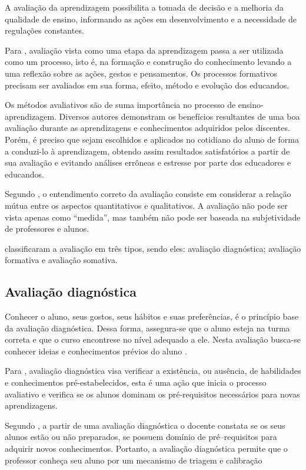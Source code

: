 \documentclass[
	12pt,				%
	openright,			%
	oneside,
	a4paper,			%
	english,			%
	french,				%
	spanish,			%
	brazil,				%
	]{abntex2}
\begin{document}
A avaliação da aprendizagem possibilita a tomada de decisão e a melhoria da qualidade de ensino, informando as ações em desenvolvimento e a necessidade de regulações constantes. \cite{kraemer2005avaliaccao}

Para , avaliação vista como uma etapa da aprendizagem passa a ser utilizada como um processo, isto é, na formação e construção do conhecimento levando a uma reflexão sobre as ações, gestos e pensamentos. Os processos formativos precisam ser avaliados em sua forma, efeito, método e evolução dos educandos.

Os métodos avaliativos são de suma importância no processo de ensino-aprendizagem. Diversos autores demonstram os benefícios resultantes de uma boa avaliação durante as aprendizagens e conhecimentos adquiridos pelos discentes. Porém, é preciso que sejam escolhidos e aplicados no cotidiano do aluno de forma a conduzi-lo à aprendizagem, obtendo assim resultados satisfatórios a partir de sua avaliação e evitando análises errôneas e estresse por parte dos educadores e educandos. \cite{da2014alunos}

Segundo , o entendimento correto da avaliação consiste em considerar a relação mútua entre os aspectos quantitativos e qualitativos. A avaliação não pode ser vista apenas como ``medida'', mas também não pode ser baseada na subjetividade de professores e alunos.

 classificaram a avaliação em três tipos, sendo eles:
avaliação diagnóstica; avaliação formativa e avaliação somativa.

\subsection{Avaliação diagnóstica}
\label{sec:AvaDiag}
Conhecer o aluno, seus gostos, seus hábitos e suas preferências, é o princípio base da avaliação diagnóstica. Dessa forma, assegura-se que o aluno esteja na turma correta e que o curso encontrese no nível adequado a ele. Nesta avaliação busca-se conhecer ideias e conhecimentos prévios do aluno \cite{masetto1994didatica}.

Para , avaliação diagnóstica visa verificar a existência, ou ausência, de
habilidades e conhecimentos pré‐estabelecidos, esta é uma ação que inicia o
processo avaliativo e verifica se os alunos dominam os pré‐requisitos necessários
para novas aprendizagens.

Segundo , a partir de uma avaliação diagnóstica o docente constata se os seus alunos estão ou não preparados, se possuem domínio de pré–requisitos para adquirir novos conhecimentos. Portanto, a avaliação diagnóstica permite que o professor conheça seu aluno por um mecanismo de triagem e calibração
\end{document}
